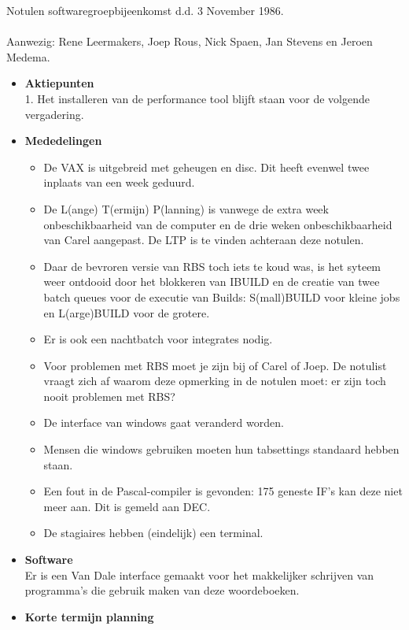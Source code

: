 Notulen softwaregroepbijeenkomst d.d. 3 November 1986. \\ \\ 
Aanwezig: Rene Leermakers, Joep Rous, Nick Spaen, Jan Stevens en Jeroen 
Medema.\\ 
\begin{itemize}
 \item {\bf Aktiepunten}\\
 1. Het installeren van de performance tool blijft staan voor de volgende 
 vergadering.
 \item {\bf Mededelingen}
 \begin{itemize}
  \item De VAX is uitgebreid met geheugen en disc. Dit heeft evenwel twee 
        inplaats van een week geduurd.
  \item De L(ange) T(ermijn) P(lanning) is vanwege de extra week 
        onbeschikbaarheid van de computer en de drie weken onbeschikbaarheid 
        van Carel aangepast. De LTP is te vinden achteraan deze notulen.
  \item Daar de bevroren versie van RBS toch iets te koud was, is het syteem 
        weer ontdooid door het blokkeren van IBUILD en de creatie van twee 
        batch queues voor de executie van Builds: S(mall)BUILD voor kleine jobs 
        en L(arge)BUILD voor de grotere.
  \item Er is ook een nachtbatch voor integrates nodig.
  \item Voor problemen met RBS moet je zijn bij of Carel of Joep. De notulist 
        vraagt zich af waarom deze opmerking in de notulen moet: er zijn toch 
        nooit problemen met RBS?
  \item De interface van windows gaat veranderd worden.
  \item Mensen die windows gebruiken moeten hun tabsettings standaard hebben 
        staan.
  \item Een fout in de Pascal-compiler is gevonden: 175 geneste IF's kan deze 
        niet meer aan. Dit is gemeld aan DEC.
  \item De stagiaires hebben (eindelijk) een terminal.
 \end{itemize}
 \item {\bf Software}\\
  Er is een Van Dale interface gemaakt voor het makkelijker schrijven van 
  programma's die gebruik maken van deze woordeboeken.
 \item {\bf Korte termijn planning}\\ 

\end{itemize}
